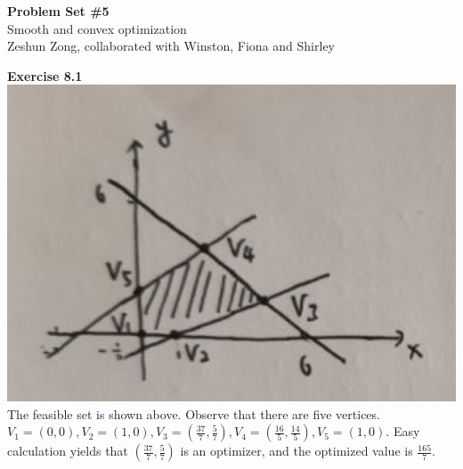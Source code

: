 \documentclass[letterpaper,12pt]{article}
\theoremstyle{definition}
\begin{document}
\begin{flushleft}
  \textbf{\large{Problem Set \#5}} \\
  Smooth and convex optimization \\
  Zeshun Zong, collaborated with Winston, Fiona and Shirley
\end{flushleft}


\noindent\textbf{Exercise 8.1}\\
\includegraphics{11.png}\\

The feasible set is shown above. Observe that there are five vertices. $V_1 = (0,0), V_2 = (1,0), V_3 = (\frac{37}{7}, \frac{5}{7}), V_4 = (\frac{16}{5}, \frac{14}{5}), V_5 = (1,0).$ Easy calculation yields that $(\frac{37}{7}, \frac{5}{7})$ is an optimizer, and the optimized value is $\frac{165}{7}.$ \\
\end{document}
